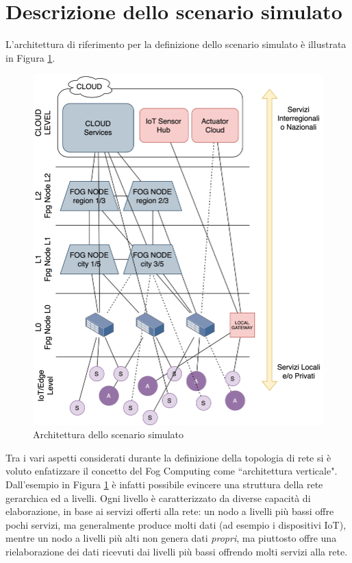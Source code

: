 \section{Descrizione dello scenario simulato}

L'architettura di riferimento per la definizione dello scenario simulato è illustrata in Figura \ref{fig:architettura_scenario}.

\begin{figure}[!ht]
  \includegraphics[width=14cm]{images/architettura_scenario}
  \centering
  \caption{Architettura dello scenario simulato}
  \label{fig:architettura_scenario}
\end{figure}

Tra i vari aspetti considerati durante la definizione della topologia di rete si è voluto enfatizzare il concetto del Fog Computing come ``architettura verticale". Dall'esempio in Figura \ref{fig:architettura_scenario} è infatti possibile evincere una struttura della rete gerarchica ed a livelli. Ogni livello è caratterizzato da diverse capacità di elaborazione, in base ai servizi offerti alla rete: un nodo a livelli più bassi offre pochi servizi, ma generalmente produce molti dati (ad esempio i dispositivi IoT), mentre un nodo a livelli più alti non genera dati \textit{propri}, ma piuttosto offre una rielaborazione dei dati ricevuti dai livelli più bassi offrendo molti servizi alla rete.

